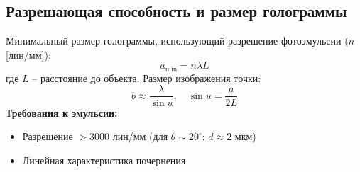 \documentclass[aps,twocolumn,secnumarabic,balancelastpage,amsmath,amssymb,nofootinbib, floatfix]{revtex4-1}
\begin{document}
\subsection*{Разрешающая способность и размер голограммы}
Минимальный размер голограммы, использующий разрешение фотоэмульсии ($n$ [лин/мм]):
\begin{equation}
	a_{\min} = n \lambda L
\end{equation}
где $L$ -- расстояние до объекта. Размер изображения точки:
\begin{equation}
	b \approx \frac{\lambda}{\sin u}, \quad \sin u = \frac{a}{2L}
\end{equation}
\textbf{Требования к эмульсии:} 
\begin{itemize}
	\item Разрешение $> 3000$ лин/мм (для $\theta \sim 20^\circ$: $d \approx 2$ мкм)
	\item Линейная характеристика почернения
\end{itemize}
\end{document}
